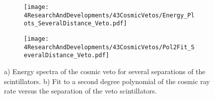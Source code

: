 \begin{figure}
\centering
    \begin{subfigure}[b]{0.85\textwidth}
    \centering
    \texttt{[image: 4ResearchAndDevelopments/43CosmicVetos/Energy\_Plots\_SeveralDistance\_Veto.pdf]}  
    \caption{\label{subfig:EnergySpectrumsSeveralDistanceVeto}}
    \end{subfigure}
    \hfill
    \begin{subfigure}[b]{0.85\textwidth}
    \centering
    \texttt{[image: 4ResearchAndDevelopments/43CosmicVetos/Pol2Fit\_SeveralDistance\_Veto.pdf]}  
    \caption{\label{subfig:LinearFitSeveralDistanceVeto}}
    \end{subfigure}
 \caption{a) Energy spectra of the cosmic veto for several separations of the scintillators. b) Fit to a second degree polynomial of the cosmic ray rate versus the separation of the veto scintillators.}
 \label{fig:DistanceVeto}
\end{figure}


